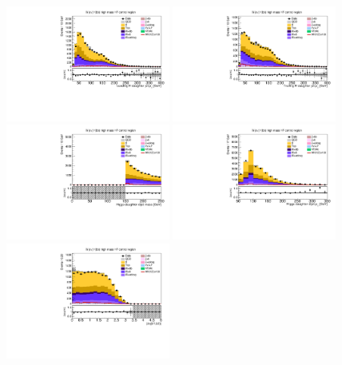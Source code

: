 \begin{figure}[tbp]
  \begin{center}
    \includegraphics[width=0.48\textwidth]{figures/wlnhbb2016/resolved/WenWHHeavyFlavorCRHighMass_Hbjet1Pt.pdf}
    \includegraphics[width=0.48\textwidth]{figures/wlnhbb2016/resolved/WenWHHeavyFlavorCRHighMass_Hbjet2Pt.pdf}
    \includegraphics[width=0.48\textwidth]{figures/wlnhbb2016/resolved/WenWHHeavyFlavorCRHighMass_mH.pdf}
    \includegraphics[width=0.48\textwidth]{figures/wlnhbb2016/resolved/WenWHHeavyFlavorCRHighMass_pTH.pdf}
    \includegraphics[width=0.48\textwidth]{figures/wlnhbb2016/resolved/WenWHHeavyFlavorCRHighMass_dEtab1b2.pdf}

\end{center}
\end{figure}
